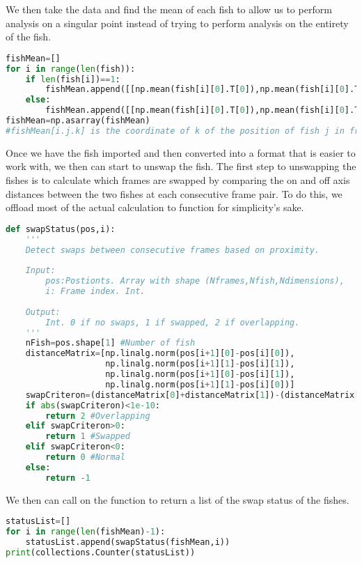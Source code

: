 \documentclass[12pt]{article}
\begin{document}
We then take the data and find the mean of each fish to allow us to perform analysis on a singular point instead of trying to perform analysis on the entirety of the fish.

\begin{lstlisting}[language=Python]
fishMean=[]
for i in range(len(fish)):
    if len(fish[i])==1:
        fishMean.append([[np.mean(fish[i][0].T[0]),np.mean(fish[i][0].T[1])],[np.mean(fish[i][0].T[0]),np.mean(fish[i][0].T[1])]])
    else:
        fishMean.append([[np.mean(fish[i][0].T[0]),np.mean(fish[i][0].T[1])],[np.mean(fish[i][1].T[0]),np.mean(fish[i][1].T[1])]])
fishMean=np.asarray(fishMean)
#fishMean[i.j.k] is the coordinate of k of the position of fish j in frame i
\end{lstlisting}

Once we have the fish imported and then converted into a format that is easier to work with, we then can start to unswap the fish. The first step to unswapping the fishes is to calculate which frames are swapped by comparing the on and off axis distances between the two fishes at each consecutive frame pair. To do this, we offload most of the actual calculation to function for simplicity's sake.
\begin{lstlisting}[language=Python]
def swapStatus(pos,i):
    '''
    Detect swaps between consecutive frames based on proximity.
    
    Input:
        pos:Postionts. Array with shape (Nframes,Nfish,Ndimensions),
        i: Frame index. Int.
    
    Output:
        Int. 0 if no swaps, 1 if swapped, 2 if overlapping.
    '''
    nFish=pos.shape[1] #Number of fish
    distanceMatrix=[np.linalg.norm(pos[i+1][0]-pos[i][0]),
                    np.linalg.norm(pos[i+1][1]-pos[i][1]),
                    np.linalg.norm(pos[i+1][0]-pos[i][1]),
                    np.linalg.norm(pos[i+1][1]-pos[i][0])]
    swapCriteron=(distanceMatrix[0]+distanceMatrix[1])-(distanceMatrix[2]+distanceMatrix[3])
    if abs(swapCriteron)<1e-10:
        return 2 #Overlapping
    elif swapCriteron>0:
        return 1 #Swapped
    elif swapCriteron<0:
        return 0 #Normal
    else:
        return -1
\end{lstlisting}

We then can call on the function to return a list of the swap status of the fishes.
\begin{lstlisting}[language=Python]
statusList=[]
for i in range(len(fishMean)-1):
    statusList.append(swapStatus(fishMean,i))
print(collections.Counter(statusList))
\end{lstlisting}
\end{document}
